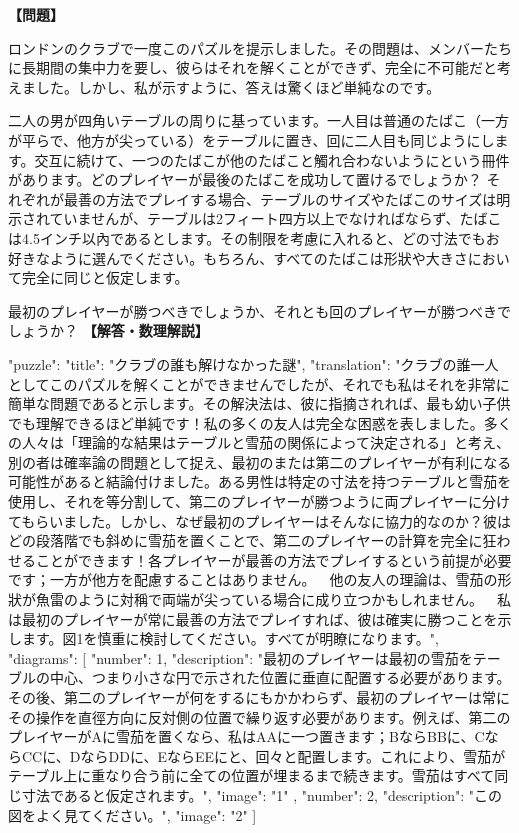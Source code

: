 \documentclass[10pt,a4paper,oneside,openany]{ltjsbook}
\begin{document}
\begin{tcolorbox}[colback=softblue,colframe=primaryblue,title=\textbf{第 398 問：THE CIGAR PUZZLE.},arc=2mm,boxrule=1pt,breakable]
\textbf{【問題】}\par\vspace{0.3em}

ロンドンのクラブで一度このパズルを提示しました。その問題は、メンバーたちに長期間の集中力を要し、彼らはそれを解くことができず、完全に不可能だと考えました。しかし、私が示すように、答えは驚くほど単純なのです。

二人の男が四角いテーブルの周りに基っています。一人目は普通のたばこ（一方が平らで、他方が尖っている）をテーブルに置き、回に二人目も同じようにします。交互に続けて、一つのたばこが他のたばこと觸れ合わないようにという冊件があります。どのプレイヤーが最後のたばこを成功して置けるでしょうか？ それぞれが最善の方法でプレイする場合、テーブルのサイズやたばこのサイズは明示されていませんが、テーブルは2フィート四方以上でなければならず、たばこは4.5インチ以內であるとします。その制限を考慮に入れると、どの寸法でもお好きなように選んでください。もちろん、すべてのたばこは形狀や大きさにおいて完全に同じと仮定します。

最初のプレイヤーが勝つべきでしょうか、それとも回のプレイヤーが勝つべきでしょうか？
\tcblower
\textbf{【解答・数理解説】}\par\vspace{0.3em}
{
  "puzzle": {
    "title": "クラブの誰も解けなかった謎",
    "translation": "クラブの誰一人としてこのパズルを解くことができませんでしたが、それでも私はそれを非常に簡単な問題であると示します。その解決法は、彼に指摘されれば、最も幼い子供でも理解できるほど単純です！私の多くの友人は完全な困惑を表しました。多くの人々は「理論的な結果はテーブルと雪茄の関係によって決定される」と考え、別の者は確率論の問題として捉え、最初のまたは第二のプレイヤーが有利になる可能性があると結論付けました。ある男性は特定の寸法を持つテーブルと雪茄を使用し、それを等分割して、第二のプレイヤーが勝つように両プレイヤーに分けてもらいました。しかし、なぜ最初のプレイヤーはそんなに協力的なのか？彼はどの段落階でも斜めに雪茄を置くことで、第二のプレイヤーの計算を完全に狂わせることができます！各プレイヤーが最善の方法でプレイするという前提が必要です；一方が他方を配慮することはありません。\
\
他の友人の理論は、雪茄の形狀が魚雷のように対稱で両端が尖っている場合に成り立つかもしれません。\
\
私は最初のプレイヤーが常に最善の方法でプレイすれば、彼は確実に勝つことを示します。図1を慎重に検討してください。すべてが明瞭になります。",
    "diagrams": [
      {
        "number": 1,
        "description": "最初のプレイヤーは最初の雪茄をテーブルの中心、つまり小さな円で示された位置に垂直に配置する必要があります。その後、第二のプレイヤーが何をするにもかかわらず、最初のプレイヤーは常にその操作を直徑方向に反対側の位置で繰り返す必要があります。例えば、第二のプレイヤーがAに雪茄を置くなら、私はAAに一つ置きます；BならBBに、CならCCに、DならDDに、EならEEにと、回々と配置します。これにより、雪茄がテーブル上に重なり合う前に全ての位置が埋まるまで続きます。雪茄はすべて同じ寸法であると仮定されます。",
        "image": "1"
      },
      {
        "number": 2,
        "description": "この図をよく見てください。",
        "image": "2"
      }
    ]
  }
}
\end{tcolorbox}
\end{document}
